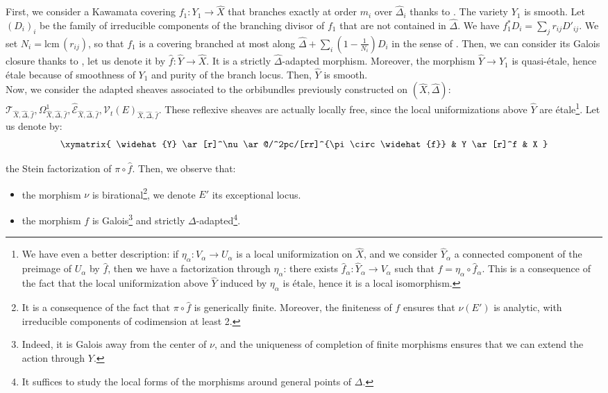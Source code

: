 \documentclass[12pt,a4paper]{amsart}
\theoremstyle{plain}
\theoremstyle{definition}
\begin{document}
First, we consider a Kawamata covering $f_1 : Y_1 \to \widehat{X}$ that branches exactly at order $m_i$ over $\widehat{\Delta}_i$ thanks to \cite[Prop.~4.1.12]{Laz04}. The variety $Y_1$ is smooth. Let $(D_i)_i$ be the family of irreducible components of the branching divisor of $f_1$ that are not contained in $\widehat{\Delta}$. We have $f_1^*D_i = \sum_j r_{ij} D'_{ij}$. We set $N_i = \mathrm{lcm}\,(r_{ij})$, so that $f_1$ is a covering branched at most along $\widehat{\Delta} + \sum_i \left( 1 - \frac{1}{N_i} \right) D_i$ in the sense of \cite[Def.~22]{CGG24}. Then, we can consider its Galois closure thanks to \cite[Cor.~27]{CGG24}, let us denote it by $\widehat{f} : \widehat{Y} \to \widehat{X}$. It is a strictly $\widehat{\Delta}$-adapted morphism. Moreover, the morphism $\widehat{Y} \to Y_1$ is quasi-\'etale, hence \'etale because of smoothness of $Y_1$ and purity of the branch locus. Then, $\widehat{Y}$ is smooth.\\

Now, we consider the adapted sheaves associated to the orbibundles previously constructed on $(\widehat{X}, \widehat{\Delta})$: $\mathcal{T}_{\widehat{X}, \widehat{\Delta}, \widehat{f}}, \Omega^1_{\widehat{X}, \widehat{\Delta}, \widehat{f}}, \widehat{\mathcal{E}}_{\widehat{X}, \widehat{\Delta}, \widehat{f}}, \mathcal{V}_t(E)_{\widehat{X}, \widehat{\Delta}, \widehat{f}}$.
These reflexive sheaves are actually locally free, since the local uniformizations above $\widehat{Y}$ are \'etale\footnote{We have even a better description: if $\eta_\alpha : V_\alpha \to U_\alpha$ is a local uniformization on $\widehat{X}$, and we consider $\widehat{Y}_\alpha$ a connected component of the preimage of $U_\alpha$ by $\widehat{f}$, then we have a factorization through $\eta_\alpha$: there exists $\widehat{f}_\alpha : \widehat{Y}_\alpha \to V_\alpha$ such that $f = \eta_\alpha \circ \widehat{f}_\alpha$. This is a consequence of the fact that the local uniformization above $\widehat{Y}$ induced by $\eta_\alpha$ is \'etale, hence it is a local isomorphism.}. Let us denote by:
$$
\xymatrix{
	\widehat{Y} \ar[r]^\nu \ar@/^2pc/[rr]^{\pi \circ \widehat{f}} & Y \ar[r]^f & X
}
$$

the Stein factorization of $\pi \circ \widehat{f}$. Then, we observe that:
\begin{itemize}
	\item the morphism $\nu$ is birational\footnote{It is a consequence of the fact that $\pi \circ \widehat{f}$ is generically finite. Moreover, the finiteness of $f$ ensures that $\nu(E')$ is analytic, with irreducible components of codimension at least 2.}, we denote $E'$ its exceptional locus.
	\item the morphism $f$ is Galois\footnote{Indeed, it is Galois away from the center of $\nu$, and the uniqueness of completion of finite morphisms ensures that we can extend the action through $Y$.} and strictly $\Delta$-adapted\footnote{It suffices to study the local forms of the morphisms around general points of $\Delta$.}.
\end{itemize}
\end{document}

